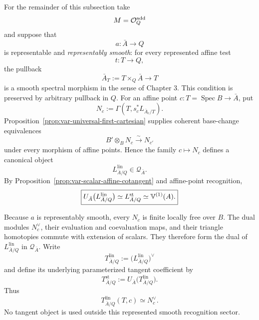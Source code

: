 \begin{convention}
\label{conv:var-jacobi-sector}
For the remainder of this subsection take
\[
    M=\mathcal O^{\mathrm{add}}_Q
\]
and suppose that
\[
    a:\bar A\longrightarrow Q
\]
is representable and \emph{representably smooth}: for every represented affine test
\[
    t:T\longrightarrow Q,
\]
the pullback
\[
    \bar A_T:=T\times_Q\bar A\longrightarrow T
\]
is a smooth spectral morphism in the sense of Chapter 3.  This condition is preserved by arbitrary pullback in \(Q\).  For an affine point \(c:T=\operatorname{Spec}B\to\bar A\), put
\[
    N_c
    :=
    \Gamma(T,s_c^*L_{\bar A_c/T}).
\]
Proposition~\ref{prop:var-universal-first-cartesian} supplies coherent base-change equivalences
\[
    B'\otimes_BN_c
    \xrightarrow{\sim}
    N_{c'}
\]
under every morphism of affine points.  Hence the family \(c\mapsto N_c\) defines a canonical object
\[
    \boxed{
    L^{\mathrm{lin}}_{\bar A/Q}
    \in
    \mathcal Q_{\bar A}.
    }
\]
By Proposition~\ref{prop:var-scalar-affine-cotangent} and affine-point recognition,
\[
    \boxed{
    U_{\bar A}\bigl(L^{\mathrm{lin}}_{\bar A/Q}\bigr)
    \simeq
    L^{\mathrm{st}}_{\bar A/Q}
    \simeq
    \mathbb V^{(1)}(A).
    }
\]

Because \(a\) is representably smooth, every \(N_c\) is finite locally free over \(B\).  The dual modules \(N_c^\vee\), their evaluation and coevaluation maps, and their triangle homotopies commute with extension of scalars.  They therefore form the dual of \(L^{\mathrm{lin}}_{\bar A/Q}\) in \(\mathcal Q_{\bar A}\).  Write
\[
    \boxed{
    T^{\mathrm{lin}}_{\bar A/Q}
    :=
    \bigl(L^{\mathrm{lin}}_{\bar A/Q}\bigr)^\vee
    }
\]
and define its underlying parameterized tangent coefficient by
\[
    \boxed{
    T^{\mathrm{st}}_{\bar A/Q}
    :=
    U_{\bar A}\bigl(T^{\mathrm{lin}}_{\bar A/Q}\bigr).
    }
\]
Thus
\[
    T^{\mathrm{lin}}_{\bar A/Q}(T,c)
    \simeq
    N_c^\vee.
\]
No tangent object is used outside this represented smooth recognition sector.
\end{convention}

